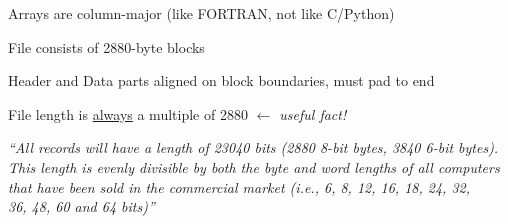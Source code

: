 \documentclass[20pt,landscape]{foils}
\begin{document}
\begin{list0}
\begin{list2}
\begin{list3}
    \end{list3}
\vspace*{-0.2cm}
    \item Arrays are column-major (like FORTRAN, not like C/Python)
\vspace*{-0.2cm}
    \item File consists of 2880-byte blocks
\vspace*{-0.2cm}
    \begin{list3}
      \item Header and Data parts aligned on block boundaries, must pad to end
      \item File length is \underline{always} a multiple of 2880
            \hspace*{1em} {\color{darkred}\sl $\leftarrow$ useful fact!}
      \item[] \hspace*{1.5em}
              \begin{minipage}{25cm}
                {\sl\small\color{darkgrey}
                ``All records will have a length of 23040 bits
                  (2880 8-bit bytes, 3840 6-bit bytes).\\
                  This length is evenly divisible by both the byte and word
                  lengths of all computers \\
                  that have been sold in the commercial market
                  (i.e., 6, 8, 12, 16, 18, 24, 32, \\
                  36, 48, 60 and 64 bits)''}
              \end{minipage}
    \end{list3}
  \end{list2}
\end{list0}

\end{document}
